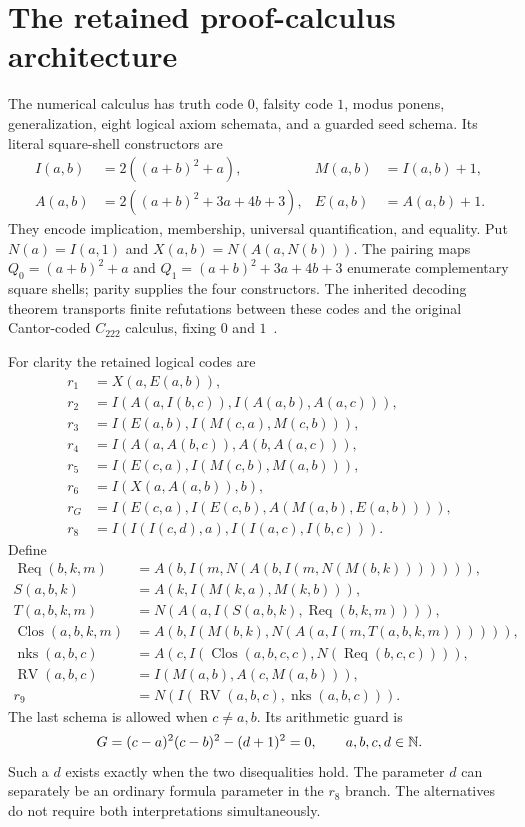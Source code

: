 \section{The retained proof-calculus architecture}

The numerical calculus has truth code $0$, falsity code $1$, modus ponens,
generalization, eight logical axiom schemata, and a guarded seed schema.
Its literal square-shell constructors are
\begin{align*}
 I(a,b)&=2((a+b)^2+a),&M(a,b)&=I(a,b)+1,\\
 A(a,b)&=2((a+b)^2+3a+4b+3),&E(a,b)&=A(a,b)+1.
\end{align*}
They encode implication, membership, universal quantification, and
equality. Put $N(a)=I(a,1)$ and $X(a,b)=N(A(a,N(b)))$.
The pairing maps $Q_0=(a+b)^2+a$ and
$Q_1=(a+b)^2+3a+4b+3$ enumerate complementary square shells;
parity supplies the four constructors. The inherited decoding theorem
transports finite refutations between these codes and the original
Cantor-coded $C_{222}$ calculus, fixing $0$ and $1$~\cite{shell}.

For clarity the retained logical codes are
\begin{align*}
 r_1&=X(a,E(a,b)),\\
 r_2&=I(A(a,I(b,c)),I(A(a,b),A(a,c))),\\
 r_3&=I(E(a,b),I(M(c,a),M(c,b))),\\
 r_4&=I(A(a,A(b,c)),A(b,A(a,c))),\\
 r_5&=I(E(c,a),I(M(c,b),M(a,b))),\\
 r_6&=I(X(a,A(a,b)),b),\\
 r_G&=I(E(c,a),I(E(c,b),A(M(a,b),E(a,b)))),\\
 r_8&=I(I(I(c,d),a),I(I(a,c),I(b,c))).
\end{align*}
Define
\begin{align*}
 \operatorname{Req}(b,k,m)
 &=A(b,I(m,N(A(b,I(m,N(M(b,k))))))),\\
 S(a,b,k)&=A(k,I(M(k,a),M(k,b))),\\
 T(a,b,k,m)&=N(A(a,I(S(a,b,k),\operatorname{Req}(b,k,m)))),\\
 \operatorname{Clos}(a,b,k,m)
 &=A(b,I(M(b,k),N(A(a,I(m,T(a,b,k,m)))))),\\
 \operatorname{nks}(a,b,c)&=A(c,I(\operatorname{Clos}(a,b,c,c),
                   N(\operatorname{Req}(b,c,c)))),\\
 \operatorname{RV}(a,b,c)&=I(M(a,b),A(c,M(a,b))),\\
 r_9&=N(I(\operatorname{RV}(a,b,c),\operatorname{nks}(a,b,c))).
\end{align*}
The last schema is allowed when $c\ne a,b$. Its arithmetic guard is
\[
 G=(c-a)^2(c-b)^2-(d+1)^2=0,\qquad a,b,c,d\in\mathbb N.
\]
Such a $d$ exists exactly when the two disequalities hold. The parameter
$d$ can separately be an ordinary formula parameter in the $r_8$ branch.
The alternatives do not require both interpretations simultaneously.

